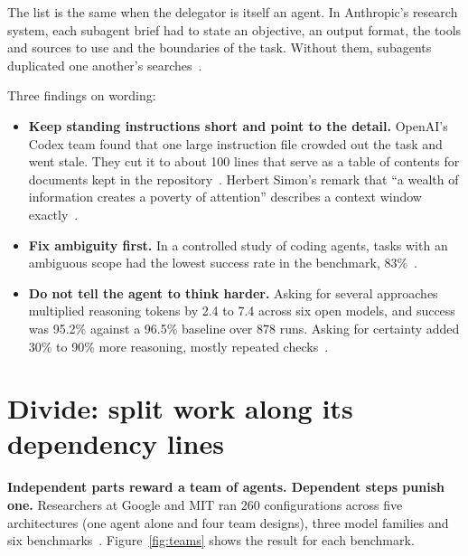 \documentclass[11pt,letterpaper]{article}
\newcommand{\takeaway}[1]{\textbf{#1}}
\begin{document}
The list is the same when the delegator is itself an agent. In Anthropic's research system,
each subagent brief had to state an objective, an output format, the tools and sources to use
and the boundaries of the task. Without them, subagents duplicated one another's
searches~\cite{research}.

Three findings on wording:

\begin{itemize}
  \item \textbf{Keep standing instructions short and point to the detail.} OpenAI's Codex team
        found that one large instruction file crowded out the task and went stale. They cut it
        to about 100 lines that serve as a table of contents for documents kept in the
        repository~\cite{openai}. Herbert Simon's remark that ``a wealth of information creates
        a poverty of attention'' describes a context window exactly~\cite{simon}.
  \item \textbf{Fix ambiguity first.} In a controlled study of coding agents, tasks with an
        ambiguous scope had the lowest success rate in the benchmark, 83\%~\cite{waste}.
  \item \textbf{Do not tell the agent to think harder.} Asking for several approaches
        multiplied reasoning tokens by 2.4 to 7.4 across six open models, and success was
        95.2\% against a 96.5\% baseline over 878 runs. Asking for certainty added 30\% to
        90\% more reasoning, mostly repeated checks~\cite{waste}.
\end{itemize}

\section{Divide: split work along its dependency lines}\label{sec:divide}

\takeaway{Independent parts reward a team of agents. Dependent steps punish one.} Researchers
at Google and MIT ran 260 configurations across five architectures (one agent alone and four
team designs), three model families and six benchmarks~\cite{kim}. Figure~\ref{fig:teams} shows the result for each benchmark.
\end{document}

